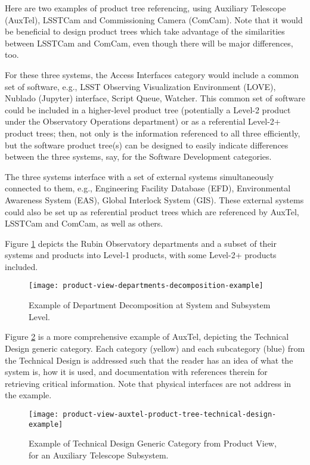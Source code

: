 Here are two examples of product tree referencing, using Auxiliary Telescope (AuxTel), LSSTCam and Commissioning Camera (ComCam).
Note that it would be beneficial to design product trees which take advantage of the similarities between LSSTCam and ComCam, even though there will be major differences, too.

For these three systems, the Access Interfaces category would include a common set of software, e.g., LSST Observing Visualization Environment (LOVE), Nublado (Jupyter) interface, Script Queue, Watcher.
This common set of software could be included in a higher-level product tree (potentially a Level-2 product under the Observatory Operations department) or as a referential Level-2+ product trees; then, not only is the information referenced to all three efficiently, but the software product tree(s) can be designed to easily indicate differences between the three systems, say, for the Software Development categories.

The three systems interface with a set of external systems simultaneously connected to them, e.g., Engineering Facility Database (EFD), Environmental Awareness System (EAS), Global Interlock System (GIS).
These external systems could also be set up as referential product trees which are referenced by AuxTel, LSSTCam and ComCam, as well as others.

Figure \ref{fig:product-view-departments-example} depicts the Rubin Observatory departments and a subset of their systems and products into Level-1 products, with some Level-2+ products included.

\begin{figure}[htp!]
\centering
\texttt{[image: product-view-departments-decomposition-example]}
\caption{Example of Department Decomposition at System and Subsystem Level.}
\label{fig:product-view-departments-example}
\end{figure}

Figure \ref{fig:product-view-auxtel-technical-design-example} is a more comprehensive example of AuxTel, depicting the Technical Design generic category.
Each category (yellow) and each subcategory (blue) from the Technical Design is addressed such that the reader has an idea of what the system is, how it is used, and documentation with references therein for retrieving critical information.
Note that physical interfaces are not address in the example.

\begin{figure}[htp!]
\centering
\texttt{[image: product-view-auxtel-product-tree-technical-design-example]}
\caption{Example of Technical Design Generic Category from Product View, for an Auxiliary Telescope Subsystem.}
\label{fig:product-view-auxtel-technical-design-example}
\end{figure}

